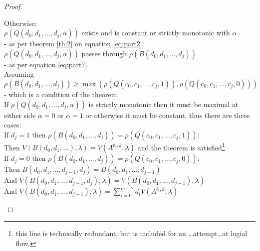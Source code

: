\begin{proof}
\begin{itemize}[leftmargin=*,labelsep=4mm]
\-\hspace{4mm}Otherwise:\\
\-\hspace{8mm}$\rho(Q(d_0,d_1,\dots,d_{j},\alpha))$ exists and is constant or strictly monotonic with $\alpha$\\
\-\hspace{8mm}- as per theorem \ref{th:2} on equation \ref{eq:part2}\\
\-\hspace{8mm}$\rho(Q(d_0,d_1,\dots,d_{j},\alpha))$ passes through $\rho(B(d_0,d_1,\dots,d_{j}))$\\
\-\hspace{8mm}- as per equation \ref{eq:part7}.\\
\-\hspace{8mm}Assuming $\rho(B(d_0,d_1,\dots,d_{j}))\ge\max(\rho(Q(c_0,c_1,\dots,c_{j},1)), \rho(Q(c_0,c_1,\dots,c_{j},0)))$\\
\-\hspace{8mm}- which is a condition of the theorem.\\
\-\hspace{8mm}If $\rho(Q(d_0,d_1,\dots,d_{j},\alpha))$ is strictly monotonic then it must be maximal at \\
\-\hspace{8mm}either side $\alpha=0$ or $\alpha=1$ or otherwise it must be constant, thus there are three cases:\\
\-\hspace{12mm}If $d_j=1$ then $\rho(B(d_0,d_1,\dots,d_{j}))=\rho(Q(c_0,c_1,\dots,c_{j},1))$:\\
\-\hspace{16mm}Then $V(B(d_0,d_1,\dots),\lambda) = V(A^{b_j,k},\lambda)$ and the theorem is satisfied\footnote{this line is technically redundant, but is included for an \dots attempt\dots at logial flow.}\\
\-\hspace{12mm}If $d_j=0$ then $\rho(B(d_0,d_1,\dots,d_{j}))=\rho(Q(c_0,c_1,\dots,c_{j},0))$: \\
\-\hspace{16mm}Then $B(d_0,d_1,\dots,d_{j-1},d_{j})=B(d_0,d_1,\dots,d_{j-1})$\\
\-\hspace{16mm}And $V(B(d_0,d_1,\dots,d_{j-1},d_{j}),\lambda) = V(B(d_0,d_1,\dots,d_{j-1}),\lambda)$\\
\-\hspace{16mm}And $V(B(d_0,d_1,\dots,d_{j-1}),\lambda) = \sum_{i=0}^{m-2}d_iV(A^{b_i,k},\lambda)$\\

\end{itemize}
\end{proof}
